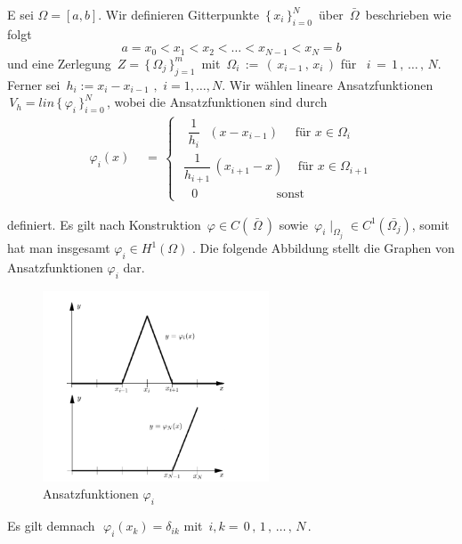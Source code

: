 \newpage
\begin{Beispiel} 
E sei $\Omega = [a,b]$. Wir definieren Gitterpunkte $\, \{ \, x_i \, \}_{i=0}^{N} \, $ über $\, \bar\Omega \, $  beschrieben wie folgt
\begin{equation*}
a = x_0 < x_1 < x_2 < \dots < x_{N-1} < x_N = b
\end{equation*}
und eine Zerlegung  $\, Z= \, \{ \, \Omega_j  \, \}_{j=1}^{m} \, $ mit $ \, \Omega_i \, := \,  ( \, x_{i-1} \, , \, x_i \,)$ für $\, \, \, i \, = \,1 \, , \, \dots \, , \, N$. 
Ferner sei $\, h_i := x_i - x_{i-1} \, \, , \, \,  i=1,\dots,N$. Wir wählen lineare Ansatzfunktionen $ \, V_h=lin \, \{ \, \varphi_i \, \}_{i=0}^{N} \,$, wobei die Ansatzfunktionen sind durch
\begin{equation*}
\begin{aligned}
\varphi_i(x) \, \, &= \, 
\begin{cases}
\, \, \, \, \dfrac{1}{h_i} \, \, \, \, (x-x_{i-1})   \, \, \, \, \, \,  \text{ für } x \in \Omega_i \\
\, \, \dfrac{1}{h_{i+1}} \, (x_{i+1}-x) \, \, \, \, \, \text{ für } x \in \Omega_{i+1}  \\
\, \, \, \, \, \,  0 \, \, \, \, \, \, \, \, \,  \, \, \, \, \, \, \, \, \, \, \, \, \, \, \, \, \, \, \, \, \, \, \, \, \, \, \, \text{ sonst }
\end{cases}
\end{aligned}
\end{equation*}

definiert. Es gilt nach Konstruktion $\, \varphi \in C(\, \bar{\Omega} \, )$ sowie $\, \varphi_{i}\mid_{\Omega_{j}} \in C^{1}(\bar{\Omega_{j}})$, somit hat man insgesamt $\varphi_i \in H^{1}(\Omega)$ \cite[184]{Numerik}.
Die folgende Abbildung stellt die Graphen von Ansatzfunktionen $\varphi_i$ dar.

\begin{figure}[ht]
	\centering
  \includegraphics[width=0.6\textwidth]{hatfunction.png}
	\caption{Ansatzfunktionen $\varphi_i$ \cite[184]{Numerik}}
	\label{fig:hat}
\end{figure}

Es gilt demnach $\, \, \varphi_i (x_k) = \delta_{ik}$ mit  $\, i  ,  k = \, 0 \, , \, 1 \, , \, \dots \,, \,N \,$.
\end{Beispiel}

